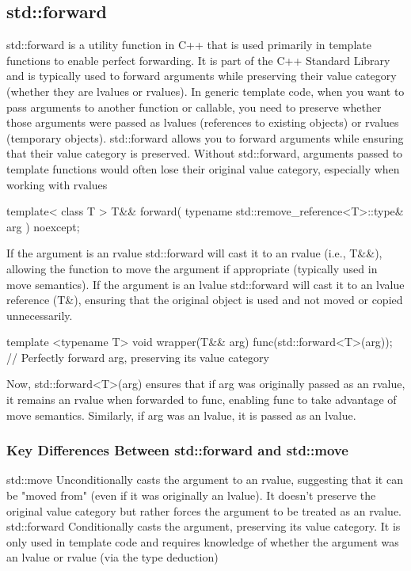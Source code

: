 \documentclass{report}
\begin{document}
     \pagebreak 
     \subsection{std::forward}
     \bigbreak \noindent 
     std::forward is a utility function in C++ that is used primarily in template functions to enable perfect forwarding. It is part of the C++ Standard Library and is typically used to forward arguments while preserving their value category (whether they are lvalues or rvalues).
     \bigbreak \noindent 
     In generic template code, when you want to pass arguments to another function or callable, you need to preserve whether those arguments were passed as lvalues (references to existing objects) or rvalues (temporary objects). std::forward allows you to forward arguments while ensuring that their value category is preserved.
     \bigbreak \noindent 
     Without std::forward, arguments passed to template functions would often lose their original value category, especially when working with rvalues
     \bigbreak \noindent 
     \begin{cppcode}
         template< class T >
         T&& forward( typename std::remove_reference<T>::type\& arg ) noexcept;
     \end{cppcode}
     \bigbreak \noindent 
     If the argument is an rvalue std::forward will cast it to an rvalue (i.e., T\&\&), allowing the function to move the argument if appropriate (typically used in move semantics).
     \bigbreak \noindent 
     If the argument is an lvalue std::forward will cast it to an lvalue reference (T\&), ensuring that the original object is used and not moved or copied unnecessarily.
     \bigbreak \noindent 
     \begin{cppcode}
         template <typename T>
         void wrapper(T&& arg) {
             func(std::forward<T>(arg));  // Perfectly forward arg, preserving its value category
         }
     \end{cppcode}
     \bigbreak \noindent 
     Now, std::forward<T>(arg) ensures that if arg was originally passed as an rvalue, it remains an rvalue when forwarded to func, enabling func to take advantage of move semantics. Similarly, if arg was an lvalue, it is passed as an lvalue.
     \bigbreak \noindent 
     \subsubsection{Key Differences Between std::forward and std::move}
     \bigbreak \noindent 
     std::move Unconditionally casts the argument to an rvalue, suggesting that it can be "moved from" (even if it was originally an lvalue). It doesn't preserve the original value category but rather forces the argument to be treated as an rvalue.
     \bigbreak \noindent 
     std::forward Conditionally casts the argument, preserving its value category. It is only used in template code and requires knowledge of whether the argument was an lvalue or rvalue (via the type deduction)
\end{document}
